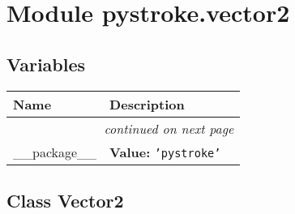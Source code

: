 %
%
%


\section{Module pystroke.vector2}

    \label{pystroke:vector2}


  \subsection{Variables}

    \vspace{-1cm}
\hspace{\varindent}\begin{longtable}{|p{\varnamewidth}|p{\vardescrwidth}|l}
\cline{1-2}
\cline{1-2} \centering \textbf{Name} & \centering \textbf{Description}& \\
\cline{1-2}
\endhead\cline{1-2}\multicolumn{3}{r}{\small\textit{continued on next page}}\\\endfoot\cline{1-2}
\endlastfoot\raggedright \_\-\_\-p\-a\-c\-k\-a\-g\-e\-\_\-\_\- & \raggedright \textbf{Value:} 
{\tt \texttt{'}\texttt{pystroke}\texttt{'}}&\\
\cline{1-2}
\end{longtable}



\subsection{Class Vector2}


